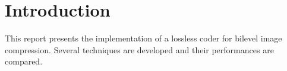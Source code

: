 \section{Introduction}

This report presents the implementation of a lossless coder for bilevel image compression. Several techniques are developed and their performances are compared.
